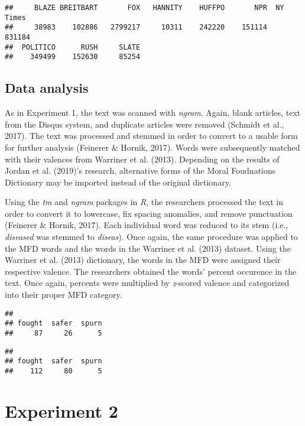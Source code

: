 \documentclass[english,,man]{apa6}
\begin{document}
\begin{verbatim}
##     BLAZE BREITBART       FOX   HANNITY    HUFFPO       NPR  NY Times 
##     38983    102886   2799217     10311    242220    151114    831184 
##  POLITICO      RUSH     SLATE 
##    349499    152630     85254
\end{verbatim}

\hypertarget{data-analysis-1}{%
\subsection{Data analysis}\label{data-analysis-1}}

As in Experiment 1, the text was scanned with \emph{ngram}. Again, blank articles, text from the Disqus system, and duplicate articles were removed (Schmidt et al., 2017). The text was processed and stemmed in order to convert to a usable form for further analysis (Feinerer \& Hornik, 2017). Words were subsequently matched with their valences from Warriner et al. (2013). Depending on the results of Jordan et al. (2019)'s research, alternative forms of the Moral Foudnations Dictionary may be imported instead of the original dictionary.

Using the \emph{tm} and \emph{ngram} packages in \emph{R}, the researchers processed the text in order to convert it to lowercase, fix spacing anomalies, and remove punctuation (Feinerer \& Hornik, 2017). Each individual word was reduced to its stem (i.e., \emph{diseased} was stemmed to \emph{diseas}). Once again, the same procedure was applied to the MFD words and the words in the Warriner et al. (2013) dataset. Using the Warriner et al. (2013) dictionary, the words in the MFD were assigned their respective valence. The researchers obtained the words' percent occurence in the text. Once again, percents were multiplied by \emph{z}-scored valence and categorized into their proper MFD category.

\begin{verbatim}
## 
## fought  safer  spurn 
##     87     26      5
\end{verbatim}

\begin{verbatim}
## 
## fought  safer  spurn 
##    112     80      5
\end{verbatim}

\hypertarget{experiment-2-1}{%
\section{Experiment 2}\label{experiment-2-1}}
\end{document}
